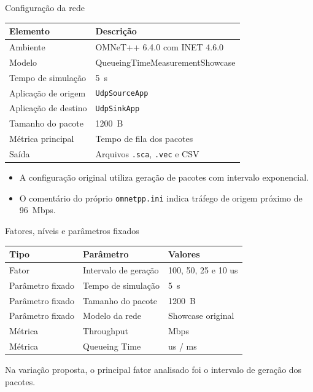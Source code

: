 \documentclass[aspectratio=169]{beamer}
\begin{document}
\begin{frame}{Configuração da rede}
\begin{table}
\centering
\small
\begin{tabular}{ll}
\toprule
\textbf{Elemento} & \textbf{Descrição} \\
\midrule
Ambiente & OMNeT++ 6.4.0 com INET 4.6.0 \\
Modelo & QueueingTimeMeasurementShowcase \\
Tempo de simulação & \SI{5}{s} \\
Aplicação de origem & \texttt{UdpSourceApp} \\
Aplicação de destino & \texttt{UdpSinkApp} \\
Tamanho do pacote & \SI{1200}{B} \\
Métrica principal & Tempo de fila dos pacotes \\
Saída & Arquivos \texttt{.sca}, \texttt{.vec} e CSV \\
\bottomrule
\end{tabular}
\end{table}

\vspace{0.4cm}

\begin{itemize}
    \item A configuração original utiliza geração de pacotes com intervalo exponencial.
    \item O comentário do próprio \texttt{omnetpp.ini} indica tráfego de origem próximo de \SI{96}{Mbps}.
\end{itemize}
\end{frame}

\begin{frame}{Fatores, níveis e parâmetros fixados}
\begin{table}
\centering
\small
\begin{tabular}{lll}
\toprule
\textbf{Tipo} & \textbf{Parâmetro} & \textbf{Valores} \\
\midrule
Fator & Intervalo de geração & 100, 50, 25 e 10 us \\
Parâmetro fixado & Tempo de simulação & \SI{5}{s} \\
Parâmetro fixado & Tamanho do pacote & \SI{1200}{B} \\
Parâmetro fixado & Modelo da rede & Showcase original \\
Métrica & Throughput & Mbps \\
Métrica & Queueing Time & us / ms \\
\bottomrule
\end{tabular}
\end{table}

\vspace{0.5cm}

\begin{informacao}
Na variação proposta, o principal fator analisado foi o intervalo de geração dos pacotes.
\end{informacao}
\end{frame}
\end{document}
